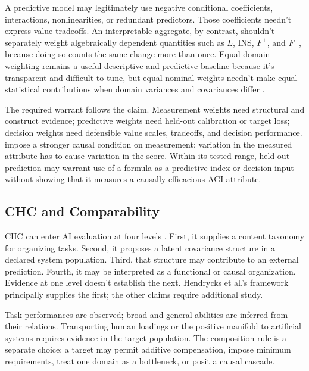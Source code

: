 \documentclass[12pt]{article}
\begin{document}
A predictive model may legitimately use negative conditional coefficients, interactions, nonlinearities, or redundant predictors. Those coefficients needn't express value tradeoffs. An interpretable aggregate, by contrast, shouldn't separately weight algebraically dependent quantities such as \(L\), INS, \(F^+\), and \(F^-\), because doing so counts the same change more than once. Equal-domain weighting remains a useful descriptive and predictive baseline because it's transparent and difficult to tune, but equal nominal weights needn't make equal statistical contributions when domain variances and covariances differ \citep[305--308]{brennan2001generalizability}.

The required warrant follows the claim. Measurement weights need structural and construct evidence; predictive weights need held-out calibration or target loss; decision weights need defensible value scales, tradeoffs, and decision performance. \textcite{borsboom2004conceptValidity} impose a stronger causal condition on measurement: variation in the measured attribute has to cause variation in the score. Within its tested range, held-out prediction may warrant use of a formula as a predictive index or decision input without showing that it measures a causally efficacious AGI attribute.

\subsection{CHC and Comparability}\label{ssec:chc_scope}

CHC can enter AI evaluation at four levels \citep{carroll1993human,mcgrew2009chc,schneider2018chc}. First, it supplies a content taxonomy for organizing tasks. Second, it proposes a latent covariance structure in a declared system population. Third, that structure may contribute to an external prediction. Fourth, it may be interpreted as a functional or causal organization. Evidence at one level doesn't establish the next. Hendrycks et al.'s framework principally supplies the first; the other claims require additional study.

Task performances are observed; broad and general abilities are inferred from their relations. Transporting human loadings or the positive manifold to artificial systems requires evidence in the target population. The composition rule is a separate choice: a target may permit additive compensation, impose minimum requirements, treat one domain as a bottleneck, or posit a causal cascade.
\end{document}
